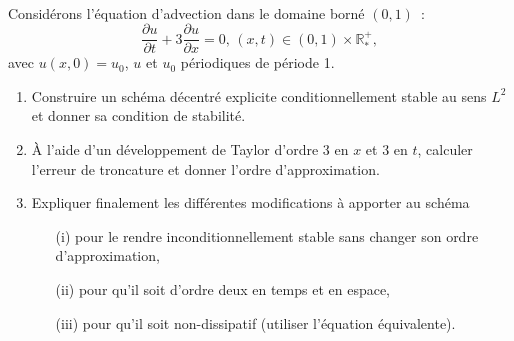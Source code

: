 \documentclass[12pt,a4paper]{article}
\begin{document}
\\
\noindent Consid\'erons l'\'equation d'advection dans le domaine born\'e $(0,1)$~:
$$
\displaystyle\frac{\partial u}{\partial t}+3\frac{\partial u}{\partial
  x}=0,\, (x,t)\in(0,1)\times\mathbb{R}^+_*,
$$
avec $u(x, 0) = u_0$, $u$ et $u_0$ p\'eriodiques de p\'eriode 1.
\begin{enumerate}
\item Construire un schéma décentré explicite conditionnellement stable au sens $L^2$ et donner sa condition de stabilité.
\item \`A l'aide d'un développement de Taylor d'ordre $3$ en $x$ et $3$ en $t$, calculer l'erreur de troncature et
donner l'ordre d'approximation.
\item Expliquer finalement les différentes modifications à apporter au schéma
\begin{itemize}
\item[(i)] pour le rendre inconditionnellement stable sans changer son ordre d'approximation,
\item[(ii)] pour qu'il soit d'ordre deux en temps et en espace,
\item[(iii)] pour qu'il soit non-dissipatif (utiliser l'équation équivalente).
\end{itemize}
\end{enumerate}
\end{document}
